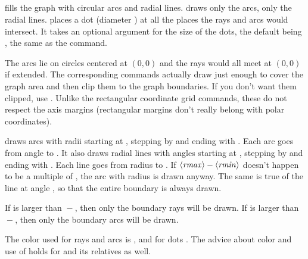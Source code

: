\documentclass[letterpaper]{article}
\begin{document}
\begin{cd}
\\
\\
\\
\\
%
%
%
%
%
%
\end{cd}

 fills the graph with circular arcs and radial lines.
 draws only the arcs,  only the radial lines.
 places a dot (diameter ) at all the places
the rays and arcs would intersect. It takes an optional argument for the
size of the dots, the default being , the same as the
 command.

The arcs lie on circles centered at $(0,0)$ and the rays would all meet
at $(0,0)$ if extended. The corresponding \MF{} commands actually draw
just enough to cover the graph area and then clip them to the graph
boundaries. If you don't want them clipped, use . Unlike
the rectangular coordinate grid commands, these do not respect the axis
margins (rectangular margins don't really belong with polar coordinates).

 draws arcs with radii starting at , stepping by
 and ending with . Each arc goes from angle
 to . It also draws radial lines with angles
starting at , stepping by  and ending with
. Each line goes from radius  to . If
$\langle\mbox{\rmfamily\itshape rmax\/}\rangle-\langle\mbox{\rmfamily\itshape rmin\/}\rangle$ doesn't happen to be a multiple of
, the arc with radius  is drawn anyway. The same
is true of the line at angle , so that the entire boundary is
always drawn.

If  is larger than ${}-{}$, then only
the boundary rays will be drawn. If  is larger than
${}-{}$, then only the boundary arcs will be
drawn.

The color used for rays and arcs is , and for dots
. The advice about color and use of  holds
for  and its relatives as well.
\end{document}

